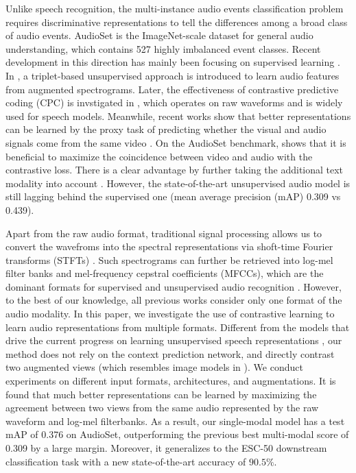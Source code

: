\documentclass{article}
\begin{document}
Unlike speech recognition, the multi-instance audio events classification problem requires discriminative representations to tell the differences among a broad class of audio events. AudioSet \cite{gemmeke2017audio} is the ImageNet-scale dataset for general audio understanding, which contains 527 highly imbalanced event classes. Recent development in this direction has mainly been focusing on supervised learning \cite{hershey2017cnn, wang2019comparison, ford2019deep, kong2020panns}. 
In \cite{jansen2018unsupervised}, a triplet-based unsupervised approach is introduced to learn audio features from augmented spectrograms.
Later, the effectiveness of contrastive predictive coding (CPC) is invstigated in \cite{wang2020contrastive}, which operates on raw waveforms and is widely used for speech models.
Meanwhile, recent works show that better representations can be learned by the proxy task of predicting whether the visual and audio signals come from the same video \cite{arandjelovic2017look, arandjelovic2018objects, korbar2018cooperative, owens2018audio, jansen2019coincidence, alwassel2019self, alayrac2020self, morgado20avid, mandela2020datatrans}.
On the AudioSet benchmark, \cite{jansen2019coincidence} shows that it is beneficial to maximize the coincidence between video and audio with the contrastive loss. There is a clear advantage by further taking the additional text modality into account \cite{alayrac2020self}. However, the state-of-the-art unsupervised audio model is still lagging behind the supervised one \cite{kong2020panns} (mean average precision (mAP) 0.309 vs 0.439). 

Apart from the raw audio format, traditional signal processing allows us to convert the wavefroms into the spectral representations via shoft-time Fourier transforms (STFTs) \cite{jurafsky2008speech}. Such spectrograms can further be retrieved into log-mel filter banks and mel-frequency cepstral coefficients (MFCCs), which are the dominant formats for supervised and unsupervised audio recognition \cite{hershey2017cnn, wang2019comparison, ford2019deep, kong2020panns, jansen2018unsupervised, jansen2019coincidence}. However, to the best of our knowledge, all previous works consider only one format of the audio modality. In this paper, we investigate the use of contrastive learning to learn audio representations from multiple formats. Different from the models that drive the current progress on learning unsupervised speech representations \cite{schneider2019wav2vec, baevski2019vq, kawakami2020learning, riviere2020unsupervised, kahn2020libri, baevski2020wav2vec}, our method does not rely on the context prediction network, and directly contrast two augmented views (which resembles image models in \cite{he2020momentum, chen2020simple}). We conduct experiments on different input formats, architectures, and augmentations. It is found that much better representations can be learned by maximizing the agreement between two views from the same audio represented by the raw waveform and log-mel filterbanks. As a result, our single-modal model has a test mAP of 0.376 on AudioSet, outperforming the previous best multi-modal score of 0.309 \cite{alayrac2020self} by a large margin. Moreover, it generalizes to the ESC-50 downstream classification task with a new state-of-the-art accuracy of $90.5\%$.
\end{document}
